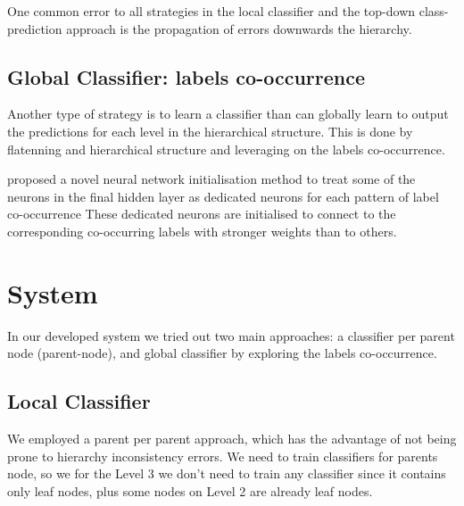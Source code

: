 \documentclass[11pt,a4paper]{article}
\begin{document}
One common error to all strategies in the local classifier and the top-down class-prediction
approach is the propagation of errors downwards the hierarchy.



\subsection{Global Classifier: labels co-occurrence}

Another type of strategy is to learn a classifier than can globally learn to output the predictions
for each level in the hierarchical structure. This is done by flatenning and hierarchical structure
and leveraging on the labels co-occurrence.

\citet{kurata-etal-2016-improved} proposed a novel neural network initialisation method to
treat some of the neurons in the final hidden layer as dedicated neurons for each pattern of label
co-occurrence These dedicated neurons are initialised to connect to the corresponding co-occurring
labels with stronger weights than to others.

\section{System}\label{system}

In our developed system we tried out two main approaches: a classifier per
parent node (parent-node), and global classifier by exploring the
labels co-occurrence.



\subsection{Local Classifier}

We employed a parent per parent approach, which has the advantage of not being
prone to hierarchy inconsistency errors. We need to train classifiers for
parents node, so we for the Level 3 we don't need to train any classifier
since it contains only leaf nodes, plus some nodes on Level 2 are already leaf
nodes.
\end{document}
